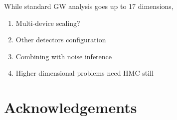 \documentclass[twocolumn]{aastex631}
\begin{document}
While standard GW analysis goes up to 17 dimensions, 



\begin{enumerate}
    \item Multi-device scaling?
    \item Other detectors configuration
    \item  Combining with noise inference
    \item Higher dimensional problems need HMC still
\end{enumerate}



\section{Acknowledgements}


\end{document}
